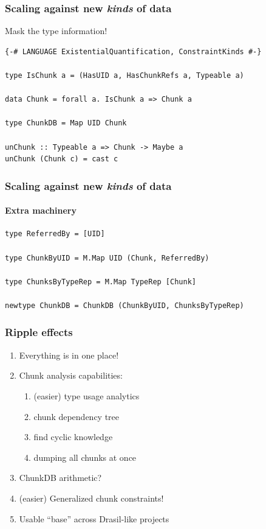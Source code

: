 \documentclass[xcolor={dvipsnames}]{beamer}
\begin{document}
\begin{frame}[fragile]
  \frametitle{Scaling against new \textit{kinds} of data}

  \begin{center}
    Mask the type information!
  \end{center}

\begin{verbatim}
{-# LANGUAGE ExistentialQuantification, ConstraintKinds #-}

type IsChunk a = (HasUID a, HasChunkRefs a, Typeable a)

data Chunk = forall a. IsChunk a => Chunk a

type ChunkDB = Map UID Chunk

unChunk :: Typeable a => Chunk -> Maybe a
unChunk (Chunk c) = cast c
\end{verbatim}
\end{frame}

\begin{frame}[fragile]
  \frametitle{Scaling against new \textit{kinds} of data}
  \framesubtitle{Extra machinery}

\begin{verbatim}
type ReferredBy = [UID]

type ChunkByUID = M.Map UID (Chunk, ReferredBy)

type ChunksByTypeRep = M.Map TypeRep [Chunk]

newtype ChunkDB = ChunkDB (ChunkByUID, ChunksByTypeRep)
\end{verbatim}
\end{frame}

\begin{frame}
  \frametitle{Ripple effects}

  \begin{enumerate}
    \item Everything is in one place!
    \item Chunk analysis capabilities:
      \begin{enumerate}
        \item (easier) type usage analytics
        \item chunk dependency tree
        \item find cyclic knowledge
        \item dumping all chunks at once
      \end{enumerate}
    \item ChunkDB arithmetic?
    \item (easier) Generalized chunk constraints!
    \item Usable ``base'' across Drasil-like projects
  \end{enumerate}
\end{frame}
\end{document}
